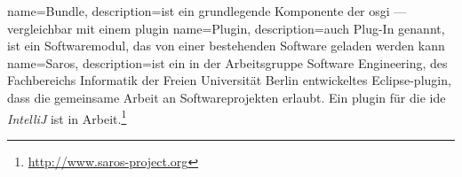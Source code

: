 {
  name=Bundle,
  description={ist ein grundlegende Komponente der \gls{osgi} --- vergleichbar mit einem \gls{plugin}}
}
{
  name=Plugin,
  description={auch Plug-In genannt, ist ein Softwaremodul, das von einer bestehenden Software geladen werden kann}
}
{
  name=Saros,
  description={ist ein in der Arbeitsgruppe Software Engineering, des Fachbereichs Informatik der Freien Universität Berlin entwickeltes Eclipse-\gls{plugin}, dass die gemeinsame Arbeit an Softwareprojekten erlaubt. Ein \gls{plugin} für die \acrshort{ide} \textit{IntelliJ} ist in Arbeit.\footnote{\href{http://www.saros-project.org}{\url{http://www.saros-project.org}}}}
}

